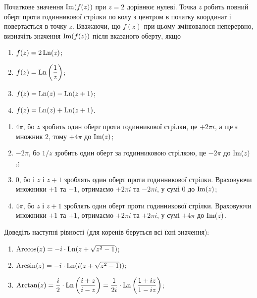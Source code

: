 \begin{problem}[Волковиський, 73]
    Початкове значення $\operatorname{Im}(f(z))$ при $z = 2$ дорівнює нулеві. Точка $z$ робить повний оберт проти годинникової стрілки по колу з центром в початку координат і повертається в точку $z$. Вважаючи, що $f(z)$ при цьому змінювалося неперервно, визначіть значення $\operatorname{Im}(f(z))$ після вказаного оберту, якщо
    \begin{enumerate}
        \item $f(z) = 2 \operatorname{Ln}(z)$;
        \item $f(z) = \operatorname{Ln}\left(\dfrac1z\right)$;
        \item $f(z) = \operatorname{Ln}(z) - \operatorname{Ln}(z + 1)$;
        \item $f(z) = \operatorname{Ln}(z) + \operatorname{Ln}(z + 1)$.
    \end{enumerate}
\end{problem}

\begin{solution}
    \begin{enumerate}
        \item $4 \pi$, бо $z$ зробить один оберт проти годинникової стрілки, це $+2 \pi i$, а ще є множник $2$, тому $+4 \pi$ до $\operatorname{Im}(z)$;
        \item $-2 \pi$, бо $1 / z$ зробить один оберт за годинниковою стрілкою, це $-2\pi$ до $\operatorname{Im}(z)$,;
        \item $0$, бо і $z$ і $z + 1$ зроблять один оберт проти годинникової стрілки. Враховуючи множники $+1$ та $-1$, отримаємо $+2 \pi i$ та $-2 \pi i$, у сумі $0$ до $\operatorname{Im}(z)$;
        \item $4 \pi$, бо $z$ і $z + 1$ зроблять один оберт проти годинникової стрілки. Враховуючи множники $+1$ та $+1$, отримаємо $+2 \pi i$ та $+2 \pi i$, у сумі $+4 \pi$ до $\operatorname{Im}(z)$.
    \end{enumerate}
\end{solution}

\begin{problem}[Волковиський, 77]
Доведіть наступні рівності (для коренів беруться всі їхні значення):
    \begin{enumerate}
        \item $\operatorname{Arccos} (z) = - i \cdot \operatorname{Ln}(z + \sqrt{z^2 - 1})$;
        \item $\operatorname{Arcsin} (z) = - i \cdot \operatorname{Ln} (i(z + \sqrt{z^2 - 1}))$;
        \item $\operatorname{Arctan} (z) = \dfrac i2 \cdot \operatorname{Ln} \left(\dfrac {i + z}{i - z}\right) = \dfrac 1 {2i} \cdot \operatorname{Ln} \left(\dfrac{1 + iz}{1 - iz}\right)$;
    \end{enumerate}
\end{problem}

